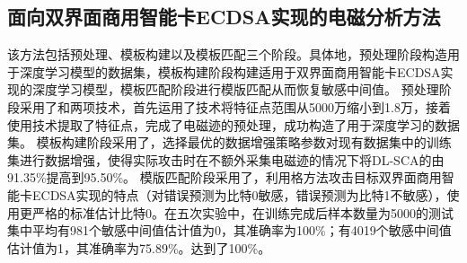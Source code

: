 {	\subsection{面向双界面商用智能卡ECDSA实现的电磁分析方法}
	
	
	
	该方法包括预处理、模板构建以及模板匹配三个阶段。具体地，预处理阶段构造用于深度学习模型的数据集，模板构建阶段构建适用于双界面商用智能卡ECDSA实现的深度学习模型，模板匹配阶段进行模版匹配从而恢复敏感中间值。
	预处理阶段采用了\poifanwei 和\yuchuli 两项技术，首先运用了\poifanwei 技术将特征点范围从5000万缩小到1.8万，接着使用\yuchuli 技术提取了特征点，完成了电磁迹的预处理，成功构造了用于深度学习的数据集。
	模板构建阶段采用了\shujuzengqiang，选择最优的数据增强策略参数对现有数据集中的训练集进行数据增强，使得实际攻击时在不额外采集电磁迹的情况下将DL-SCA的\zyx 由91.35\%提高到95.50\%。
	模版匹配阶段采用了\jiashejianyanguji ，利用格方法攻击目标双界面商用智能卡ECDSA实现的特点（对错误预测为比特0敏感，错误预测为比特1不敏感），使用更严格的标准估计比特0。在五次实验中，在训练完成后样本数量为5000的测试集中平均有981个敏感中间值估计值为0，其准确率为100\%；有4019个敏感中间值估计值为1，其准确率为75.89\%。\zyx 达到了100\%。
	
}
